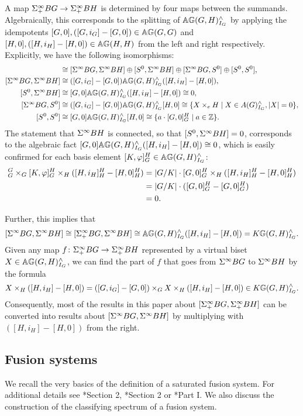 \documentclass[10pt]{amsart}
\theoremstyle{definition}
\renewcommand{\phi}{\varphi}
\DeclarePairedDelimiter{\abs}{\lvert}{\rvert}
\begin{document}
A map $\Sigma^{\infty}_{+} BG \rightarrow \Sigma^{\infty}_{+} BH$ is determined by four maps between the summands. Algebraically, this corresponds to the splitting of $\mathbb{A} \mathbb{G}(G,H)^{\wedge}_{I_G}$ by applying the idempotents $[G,0], ([G,i_G]-[G,0]) \in \mathbb{A} \mathbb{G}(G,G)$ and $[H,0], ([H, i_H] - [H,0])  \in \mathbb{A} \mathbb{G}(H,H)$ from the left and right respectively. Explicitly, we have the following isomorphisms:
\begin{align*}
[\Sinfp BG, \Sinfp BH] &\cong [\Sinf BG, \Sinf BH] \oplus [S^0,\Sinf BH] \oplus [\Sinf BG, S^0] \oplus [S^0,S^0],
\\ [\Sinf BG, \Sinf BH] &\cong ([G,i_G]-[G,0]) \AG(G,H)^{\wedge}_{I_G} ([H, i_H] - [H,0]),
\\ [S^0,\Sinf BH] &\cong [G,0] \AG(G,H)^{\wedge}_{I_G} ([H, i_H] - [H,0]) \cong 0,
\\ [\Sinf BG, S^0] &\cong ([G,i_G]-[G,0]) \AG(G,H)^{\wedge}_{I_G} [H,0] \cong \{X \times_e H\mid X\in A(G)^\wedge_{I_G}, \abs{X} = 0\},
\\ [S^0,S^0] &\cong [G,0] \AG(G,H)^{\wedge}_{I_G} [H,0] \cong \{a\cdot[G,0]_G^H \mid a\in \Z\}.
\end{align*}
The statement that $\Sigma^{\infty} BH$ is connected, so that $[S^0,\Sigma^{\infty} BH]=0$, corresponds to the algebraic fact $[G,0] \mathbb{A} \mathbb{G}(G,H)^{\wedge}_{I_G} ([H, i_H] - [H,0]) \cong 0$, which is easily confirmed for each basis element $[K,\phi]_G^H\in \AG(G,H)^{\wedge}_{I_G}$:
\begin{align*}
[G,0]_G^G \times_G [K,\phi]_G^H \times_H ([H, i_H]_H^H - [H,0]_H^H) &= \abs{G/K}\cdot [G,0]_G^H \times_H ([H, i_H]_H^H - [H,0]_H^H)
\\ &=\abs{G/K} \cdot ([G,0]_G^H - [G,0]_G^H)
\\ &= 0.
\end{align*}

Further, this implies that
\[[\Sigma^{\infty} BG, \Sigma^{\infty} BH] \cong [\Sigma^{\infty}_{+} BG, \Sigma^{\infty} BH] \cong \mathbb{A} \mathbb{G}(G,H)^{\wedge}_{I_G} ([H, i_H] - [H,0])= K \mathbb{G}(G,H)^\wedge_{I_G}.\]
Given any map $f\colon \Sigma^{\infty}_{+} BG\to \Sigma^{\infty}_{+} BH$ represented by a virtual biset $X\in \mathbb{A} \mathbb{G}(G,H)^\wedge_{I_G}$, we can find the part of $f$ that goes from $\Sigma^{\infty} BG$ to $\Sigma^{\infty} BH$ by the formula
\[X\times_H ([H, i_H] - [H,0]) = ([G,i_G]-[G,0])\times_G X\times_H ([H, i_H] - [H,0]) \in K \mathbb{G}(G,H)^\wedge_{I_G}.\]
Consequently, most of the results in this paper about $[\Sigma^{\infty}_{+} BG, \Sigma^{\infty}_{+} BH]$ can be converted into results about $[\Sigma^{\infty} BG, \Sigma^{\infty} BH]$ by multiplying with $([H, i_H] - [H,0])$ from the right.

\subsection{Fusion systems}\label{secFusionSystems}
We recall the very basics of the definition of a saturated fusion system. For additional details see \cite{ReehIdempotent}*{Section 2}, \cite{RagnarssonStancu}*{Section 2} or \cite{AKO}*{Part I}. We also discuss the construction of the classifying spectrum of a fusion system.
\end{document}
